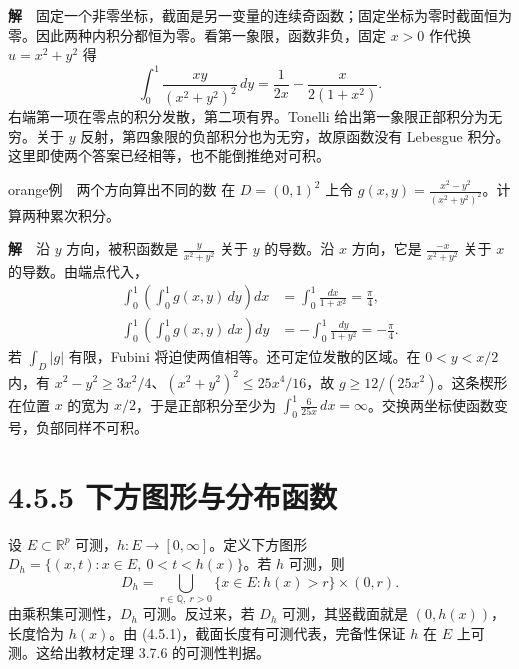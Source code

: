 \documentclass[11pt,a4paper]{article}
\begin{document}
\textbf{解}　固定一个非零坐标，截面是另一变量的连续奇函数；固定坐标为零时截面恒为零。因此两种内积分都恒为零。看第一象限，函数非负，固定
\(x>0\) 作代换 \(u=x^2+y^2\) 得 \begin{equation*}
\int_0^1\frac{xy}{(x^2+y^2)^2}\,dy
=\frac{1}{2x}-\frac{x}{2(1+x^2)} .
\end{equation*} 右端第一项在零点的积分发散，第二项有界。Tonelli
给出第一象限正部积分为无穷。关于 \(y\)
反射，第四象限的负部积分也为无穷，故原函数没有 Lebesgue
积分。这里即使两个答案已经相等，也不能倒推绝对可积。

\begin{sboxenv}{orange}{例　两个方向算出不同的数}
在 \(D=(0,1)^2\) 上令
\(g(x,y)=\frac{x^2-y^2}{(x^2+y^2)^2}\)。计算两种累次积分。

\end{sboxenv}

\textbf{解}　沿 \(y\) 方向，被积函数是 \(\frac{y}{x^2+y^2}\) 关于 \(y\)
的导数。沿 \(x\) 方向，它是 \(\frac{-x}{x^2+y^2}\) 关于 \(x\)
的导数。由端点代入， \begin{equation*}
\begin{aligned}
\int_0^1\left(\int_0^1 g(x,y)\,dy\right)dx
 &=\int_0^1\frac{dx}{1+x^2}=\frac{\pi}{4},\\
\int_0^1\left(\int_0^1 g(x,y)\,dx\right)dy
 &=-\int_0^1\frac{dy}{1+y^2}=-\frac{\pi}{4}.
\end{aligned}
\end{equation*} 若 \(\int_D|g|\) 有限，Fubini 将迫使两值相等。还可定位发散的区域。在
\(0<y<x/2\) 内，有
\(x^2-y^2\ge 3x^2/4\)、\((x^2+y^2)^2\le 25x^4/16\)，故
\(g\ge 12/(25x^2)\)。这条楔形在位置 \(x\) 的宽为
\(x/2\)，于是正部积分至少为
\(\int_0^1\frac{6}{25x}\,dx=\infty\)。交换两坐标使函数变号，负部同样不可积。

\section[\S{}4.5.5
下方图形与分布函数]{4.5.5
下方图形与分布函数}\label{ux4e0bux65b9ux56feux5f62ux4e0eux5206ux5e03ux51fdux6570}

设 \(E\subset\mathbb R^p\) 可测，\(h:E\to[0,\infty]\)。定义下方图形
\(D_h=\{(x,t):x\in E,\ 0<t<h(x)\}\)。若 \(h\) 可测，则 \begin{equation*}
D_h=\bigcup_{r\in\mathbb Q,\ r>0}\{x\in E:h(x)>r\}\times(0,r).
\end{equation*} 由乘积集可测性，\(D_h\) 可测。反过来，若 \(D_h\) 可测，其竖截面就是
\((0,h(x))\)，长度恰为 \(h(x)\)。由
(4.5.1)，截面长度有可测代表，完备性保证 \(h\) 在 \(E\)
上可测。这给出教材定理 3.7.6 的可测性判据。
\end{document}
